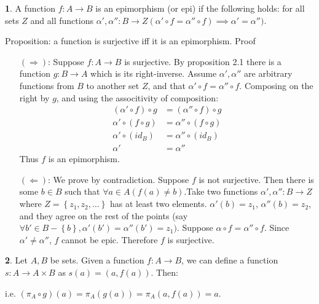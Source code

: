 \documentclass{article}
\theoremstyle{definition}
\newcommand{\set}[1]{\left\{#1\right\}}
\theoremstyle{definition}
\theoremstyle{definition}
\newtheorem{solution-internal}{}[subsection]
\newenvironment{solution}{
  \medskip
  \begin{solution-internal}
}{
  \end{solution-internal}
}
\begin{document}
\begin{solution}
A function $f\colon A \to B$ is an epimorphism (or epi) if the following holds:
for all sets $Z$ and all functions $\alpha', \alpha''\colon B \to Z (\alpha' \circ f = \alpha'' \circ f) \implies \alpha' = \alpha'')$.

Proposition: a function is surjective iff it is an epimorphism.
Proof
\begin{itemize}
\item[$(\Rightarrow)$:] Suppose $f\colon A \to B$ is surjective. By proposition 2.1 there is a function $g\colon B \to A$ which is its right-inverse. Assume $\alpha',\alpha''$ are arbitrary functions from $B$ to another set $Z$, and that $\alpha' \circ f = \alpha'' \circ f$.
Composing on the right by $g$, and using the associtivity of composition:
\begin{align*}
(\alpha' \circ f)\circ g &= (\alpha''\circ f)\circ g \\
\alpha' \circ (f\circ g) &= \alpha''\circ (f\circ g) \\
\alpha' \circ (id_B) &= \alpha''\circ (id_B) \\
\alpha' &= \alpha''
\end{align*}
Thus $f$ is an epimorphism.
\item[$(\Leftarrow)$:] We prove by contradiction. Suppose $f$ is not
surjective. Then there is some $b \in B$ such that $\forall a \in A (f(a) \neq
b)$.Take two functions $\alpha', \alpha''\colon B \to Z$ where $Z =
\set{z_1,z_2,\dots}$ has at least two elements. $\alpha'(b) = z_1$,
$\alpha''(b) = z_2$, and they agree on the rest of the points (say $\forall b' \in B - \set{b}, \alpha'(b') = \alpha''(b') = z_1)$.
Suppose $\alpha \circ f = \alpha'' \circ f$. Since $\alpha' \neq \alpha''$, $f$
cannot be epic. Therefore $f$ is surjective.
\end{itemize}
\end{solution}

\begin{solution}
Let $A, B$ be sets. Given a function $f\colon A\to B$, we can define a function $s\colon A \to A \times B$ as $s(a) = (a, f(a))$. Then:

\begin{center}
\end{center}

i.e. $(\pi_A \circ g)(a) = \pi_A(g(a)) = \pi_A(a, f(a)) = a$.
\end{solution}
\end{document}
